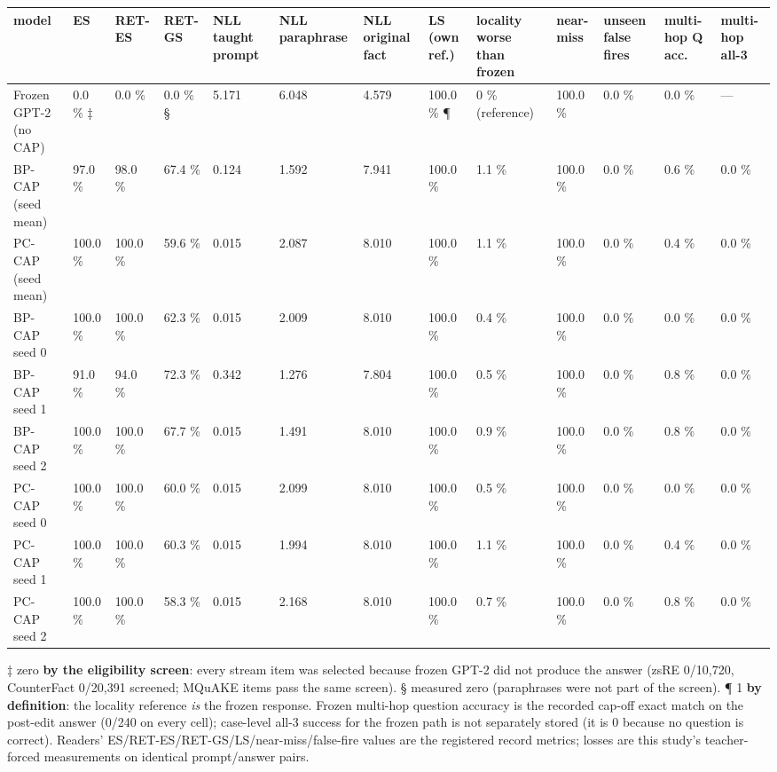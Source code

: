 \documentclass[10pt,a4paper]{article}
\begin{document}
\begin{center}\tiny
\begin{tabularx}{\textwidth}{@{}p{}XXXXXXXXXXXX@{}}
\toprule
model & ES & RET-ES & RET-GS & NLL taught prompt & NLL paraphrase & NLL original fact & LS (own ref.) & locality worse than frozen & near-miss & unseen false fires & multi-hop Q acc. & multi-hop all-3 \\ \midrule
Frozen GPT-2 (no CAP) & 0.0 \% ‡ & 0.0 \% & 0.0 \% § & 5.171 & 6.048 & 4.579 & 100.0 \% ¶ & 0 \% (reference) & 100.0 \% & 0.0 \% & 0.0 \% & — \\
BP-CAP (seed mean) & 97.0 \% & 98.0 \% & 67.4 \% & 0.124 & 1.592 & 7.941 & 100.0 \% & 1.1 \% & 100.0 \% & 0.0 \% & 0.6 \% & 0.0 \% \\
PC-CAP (seed mean) & 100.0 \% & 100.0 \% & 59.6 \% & 0.015 & 2.087 & 8.010 & 100.0 \% & 1.1 \% & 100.0 \% & 0.0 \% & 0.4 \% & 0.0 \% \\
BP-CAP seed 0 & 100.0 \% & 100.0 \% & 62.3 \% & 0.015 & 2.009 & 8.010 & 100.0 \% & 0.4 \% & 100.0 \% & 0.0 \% & 0.0 \% & 0.0 \% \\
BP-CAP seed 1 & 91.0 \% & 94.0 \% & 72.3 \% & 0.342 & 1.276 & 7.804 & 100.0 \% & 0.5 \% & 100.0 \% & 0.0 \% & 0.8 \% & 0.0 \% \\
BP-CAP seed 2 & 100.0 \% & 100.0 \% & 67.7 \% & 0.015 & 1.491 & 8.010 & 100.0 \% & 0.9 \% & 100.0 \% & 0.0 \% & 0.8 \% & 0.0 \% \\
PC-CAP seed 0 & 100.0 \% & 100.0 \% & 60.0 \% & 0.015 & 2.099 & 8.010 & 100.0 \% & 0.5 \% & 100.0 \% & 0.0 \% & 0.0 \% & 0.0 \% \\
PC-CAP seed 1 & 100.0 \% & 100.0 \% & 60.3 \% & 0.015 & 1.994 & 8.010 & 100.0 \% & 1.1 \% & 100.0 \% & 0.0 \% & 0.4 \% & 0.0 \% \\
PC-CAP seed 2 & 100.0 \% & 100.0 \% & 58.3 \% & 0.015 & 2.168 & 8.010 & 100.0 \% & 0.7 \% & 100.0 \% & 0.0 \% & 0.8 \% & 0.0 \% \\
\bottomrule
\end{tabularx}
\end{center}



‡ zero \textbf{by the eligibility screen}: every stream item was selected because frozen GPT-2 did not produce the answer (zsRE 0/10,720, CounterFact 0/20,391 screened; MQuAKE items pass the same screen). § measured zero (paraphrases were not part of the screen). ¶ 1 \textbf{by definition}: the locality reference \emph{is} the frozen response. Frozen multi-hop question accuracy is the recorded cap-off exact match on the post-edit answer (0/240 on every cell); case-level all-3 success for the frozen path is not separately stored (it is 0 because no question is correct). Readers' ES/RET-ES/RET-GS/LS/near-miss/false-fire values are the registered record metrics; losses are this study's teacher-forced measurements on identical prompt/answer pairs.
\end{document}
